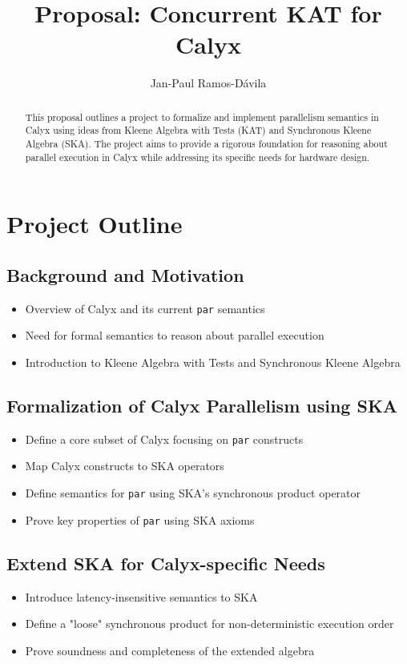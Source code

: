 \documentclass[sigplan,10pt,authorversion,nonacm]{acmart}
\title{Proposal: Concurrent KAT for Calyx}
\author{Jan-Paul Ramos-D\'{a}vila}
\affiliation{%
  \institution{Cornell University}
  \city{Ithaca}
  \state{NY}
  \country{USA}}
\theoremstyle{remark}
\begin{document}
\begin{abstract}
This proposal outlines a project to formalize and implement parallelism semantics in Calyx using ideas from Kleene Algebra with Tests (KAT) and Synchronous Kleene Algebra (SKA). The project aims to provide a rigorous foundation for reasoning about parallel execution in Calyx while addressing its specific needs for hardware design.
\end{abstract}

\maketitle

\section{Project Outline}

\subsection{Background and Motivation}
\begin{itemize}
    \item Overview of Calyx and its current \texttt{par} semantics
    \item Need for formal semantics to reason about parallel execution
    \item Introduction to Kleene Algebra with Tests and Synchronous Kleene Algebra
\end{itemize}

\subsection{Formalization of Calyx Parallelism using SKA}
\begin{itemize}
    \item Define a core subset of Calyx focusing on \texttt{par} constructs
    \item Map Calyx constructs to SKA operators
    \item Define semantics for \texttt{par} using SKA's synchronous product operator
    \item Prove key properties of \texttt{par} using SKA axioms
\end{itemize}

\subsection{Extend SKA for Calyx-specific Needs}
\begin{itemize}
    \item Introduce latency-insensitive semantics to SKA
    \item Define a "loose" synchronous product for non-deterministic execution order
    \item Prove soundness and completeness of the extended algebra
\end{itemize}
\end{document}
